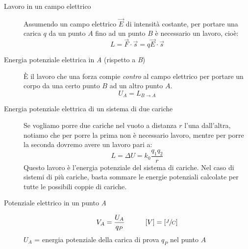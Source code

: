 \documentclass[a4paper,11pt,italian]{article}
\begin{document}
\begin{description}
  
  \item[Lavoro in un campo elettrico] 
  Assumendo un campo elettrico $ \vec{E} $ di intensità costante, per portare una carica $ q $ da un punto $ A $ fino ad un punto $ B $ è necessario un lavoro, cioè:
  \[ L = \vec{F} \cdot \vec{s} = q \vec{E} \cdot \vec{s}  \]
  
  \item[Energia potenziale elettrica in \textit{A} (rispetto a \textit{B})] 
  È il lavoro che una forza compie \textit{contro} al campo elettrico per portare un corpo da una certo punto $ B $ ad un altro punto $ A $.
  \[ U_A = L_{B\rightarrow A} \]
  
  \item[Energia potenziale elettrica di un sistema di due cariche] 
  Se vogliamo porre due cariche nel vuoto a distanza $ r $ l'una dall'altra, notiamo che per porre la prima non è necessario lavoro, mentre per porre la seconda dovremo avere un lavoro pari a:
  \[ L = \Delta U = k_0 \frac{q_1 q_2}{r}  \]
  Questo lavoro è l'energia potenziale del sistema di cariche. Nel caso di sistemi di più cariche, basta sommare le energie potenziali calcolate per tutte le possibili coppie di cariche.
  
  \item[Potenziale elettrico in un punto \textit{A}]
  \[ V_A = \frac{U_A}{q_P} \hspace*{3em} [V] =  \left[ \sfrac{J}{C} \right] \]
  $ U_A $ = energia potenziale della carica di prova $ q_P $ nel punto $ A $
  

\end{description}
\end{document}
